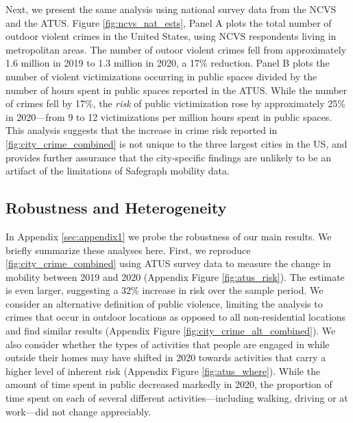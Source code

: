 \documentclass[12pt]{article}
\begin{document}
Next, we present the same analysis using national survey data from the NCVS and the ATUS. Figure \ref{fig:ncvs_nat_ests}, Panel A plots the total number of outdoor violent crimes in the United States, using NCVS respondents living in metropolitan areas. The number of outoor violent crimes fell from approximately 1.6 million in 2019 to 1.3 million in 2020, a 17\% reduction. Panel B plots the number of violent victimizations occurring in public spaces divided by the number of hours spent in public spaces reported in the ATUS. While the number of crimes fell by 17\%, the \emph{risk} of public victimization rose by approximately 25\% in 2020---from 9 to  12 victimizations per million hours spent in public spaces. This analysis suggests that the increase in crime risk reported in \autoref{fig:city_crime_combined} is not unique to the three largest cities in the US, and provides further assurance that the city-specific findings are unlikely to be an artifact of the limitations of Safegraph mobility data. 


\subsection{Robustness and Heterogeneity}
In Appendix \ref{sec:appendix1} we probe the robustness of our main results. We briefly summarize these analyses here. First, we reproduce \autoref{fig:city_crime_combined} using ATUS survey data to measure the change in mobility between 2019 and 2020 (Appendix Figure \ref{fig:atus_risk}). %
The estimate is even larger, suggesting a 32\% increase in risk over the sample period. We consider an alternative definition of public violence, limiting the analysis to crimes that occur in outdoor locations as opposed to all non-residential locations and find similar results (Appendix Figure \ref{fig:city_crime_alt_combined}). We also consider whether the types of activities that people are engaged in while outside their homes may have shifted in 2020 towards activities that carry a higher level of inherent risk (Appendix Figure \ref{fig:atus_where}). While the amount of time spent in public decreased markedly in 2020, the proportion of time spent on each of several different activities---including walking, driving or at work---did not change appreciably. 
\end{document}
